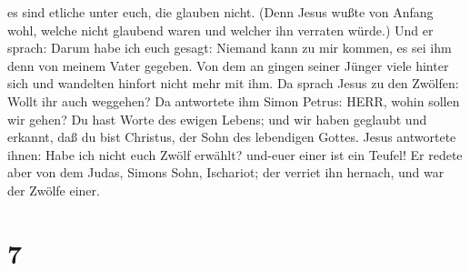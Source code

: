 es sind etliche unter euch, die glauben nicht. (Denn Jesus wußte von
Anfang wohl, welche nicht glaubend waren und welcher ihn verraten
würde.)  Und er sprach: Darum habe ich euch gesagt: Niemand
kann zu mir kommen, es sei ihm denn von meinem Vater gegeben.
 Von dem an gingen seiner Jünger viele hinter sich und
wandelten hinfort nicht mehr mit ihm.  Da sprach Jesus zu
den Zwölfen: Wollt ihr auch weggehen?  Da antwortete ihm
Simon Petrus: HERR, wohin sollen wir gehen? Du hast Worte des ewigen
Lebens;  und wir haben geglaubt und erkannt, daß du bist
Christus, der Sohn des lebendigen Gottes.  Jesus antwortete
ihnen: Habe ich nicht euch Zwölf erwählt? und-euer einer ist ein Teufel!
 Er redete aber von dem Judas, Simons Sohn, Ischariot; der
verriet ihn hernach, und war der Zwölfe einer.

\hypertarget{section-6}{%
\section{7}\label{section-6}}

